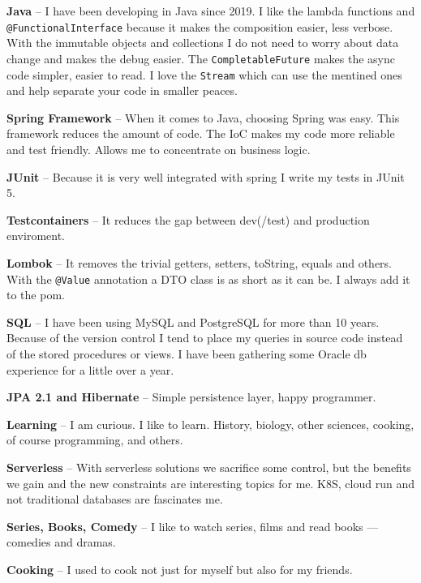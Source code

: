 \documentclass[9pt]{developercv} %
\begin{document}
\begin{minipage}[t]{0.49\textwidth}
    \vspace{-\baselineskip} %


    \textbf{Java} -- I have been developing in Java since 2019.
        I like the lambda functions and \texttt{@FunctionalInterface} because it makes the composition easier, less verbose.
        With the immutable objects and collections I do not need to worry about data change and makes the debug easier.
        The \texttt{CompletableFuture} makes the async code simpler, easier to read.
        I love the \texttt{Stream} which can use the mentined ones and help separate your code in smaller peaces.

    \textbf{Spring Framework} -- When it comes to Java, choosing Spring was easy.
    This framework reduces the amount of code. 
    The IoC makes my code more reliable and test friendly. Allows me to concentrate on business logic.

    \textbf{JUnit} -- Because it is very well integrated with spring I write my tests in JUnit 5.

    \textbf{Testcontainers} -- It reduces the gap between dev(/test) and production enviroment.

    \textbf{Lombok} -- It removes the trivial getters, setters, toString, equals and others. With the \texttt{@Value} annotation a DTO class is as short as it can be. I always add it to the pom.

    \textbf{SQL} -- I have been using MySQL and PostgreSQL for more than 10 years.
    Because of the version control I tend to place my queries in source code instead of the stored procedures or views. I have been gathering some Oracle db experience for a little over a year.

    \textbf{JPA 2.1 and Hibernate} -- Simple persistence layer, happy programmer.

\end{minipage}


\textbf{Learning} -- I am curious. I like to learn. History, biology, other sciences, cooking, of course programming, and others.

\textbf{Serverless} -- With serverless solutions we sacrifice some control, but the benefits we gain and the new constraints are interesting topics for me. K8S, cloud run and not traditional databases are fascinates me.

\textbf{Series, Books, Comedy} -- I like to watch series, films and read books — comedies and dramas.

\textbf{Cooking} -- I used to cook not just for myself but also for my friends.
\end{document}
